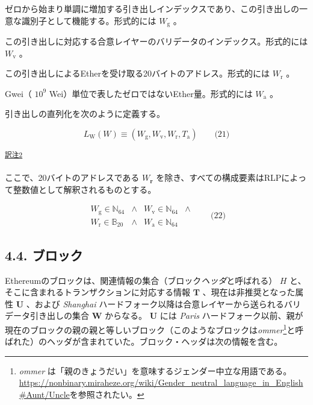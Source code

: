 \documentclass[
]{ltjsarticle}
\providecommand{\tightlist}{%
  \setlength{\itemsep}{0pt}\setlength{\parskip}{0pt}}
\begin{document}
\begin{description}
\tightlist
\item[globalIndex]
ゼロから始まり単調に増加する引き出しインデックスであり、この引き出しの一意な識別子として機能する。形式的には
\(W_{\mathrm{g}}\) 。
\item[validatorIndex]
この引き出しに対応する合意レイヤーのバリデータのインデックス。形式的には
\(W_{\mathrm{v}}\) 。
\item[recipient]
この引き出しによるEtherを受け取る20バイトのアドレス。形式的には
\(W_{\mathrm{r}}\) 。
\item[amount]
Gwei（ \(10^9\) Wei）単位で表したゼロではないEther量。形式的には
\(W_{\mathrm{a}}\) 。
\end{description}

引き出しの直列化を次のように定義する。

\protect\hypertarget{eq-21}{}{}

\[L_{\mathrm{W}}(W) \equiv
(W_{\mathrm{g}}, W_{\mathrm{v}}, W_{\mathrm{r}}, T_{\mathrm{a}}) \qquad \text{(21)}\]

\protect\hypertarget{tnref-2}{}{}\textsuperscript{\protect\hyperlink{tn-2}{訳注2}}

ここで、20バイトのアドレスである \(W_\mathbf{r}\)
を除き、すべての構成要素はRLPによって整数値として解釈されるものとする。

\protect\hypertarget{eq-22}{}{}

\[\begin{array}{lclc}
W_{\mathrm{g}} \in \mathbb{N}_{64} & \wedge & W_{\mathrm{v}} \in \mathbb{N}_{64} & \wedge \\
W_{\mathrm{r}} \in \mathbb{B}_{20} & \wedge & W_{\mathrm{a}} \in \mathbb{N}_{64}
\end{array} \qquad \text{(22)}\]

\protect\hypertarget{subsec:The_Block}{}{}

\protect\hypertarget{block}{}{}

\hypertarget{ux30d6ux30edux30c3ux30af}{%
\subsection{4.4. ブロック}\label{ux30d6ux30edux30c3ux30af}}

Ethereumのブロックは、関連情報の集合（ブロック\emph{ヘッダ}と呼ばれる）
\(H\) と、そこに含まれるトランザクションに対応する情報 \(\mathbf{T}\)
、\protect\hypertarget{ommerheaders}{}{}現在は非推奨となった属性
\(\mathbf{U}\) 、および \emph{Shanghai}
ハードフォーク以降は合意レイヤーから送られるバリデータ引き出しの集合
\(\mathbf{W}\) からなる。 \(\mathbf{U}\) には \emph{Paris}
ハードフォーク以前、親が現在のブロックの親の親と等しいブロック（このようなブロックは\emph{ommer}\footnote{\emph{ommer}
  は「親のきょうだい」を意味するジェンダー中立な用語である。\url{https://nonbinary.miraheze.org/wiki/Gender_neutral_language_in_English\#Aunt/Uncle}を参照されたい。}と呼ばれた）のヘッダが含まれていた。ブロック・ヘッダは次の情報を含む。
\end{document}
